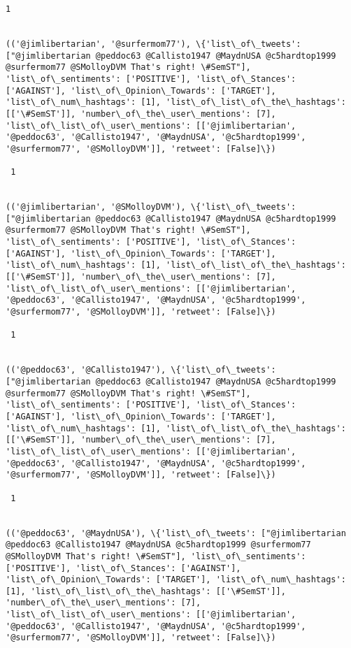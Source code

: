 \documentclass[11pt]{article}
\begin{document}
\begin{Verbatim}[commandchars=\\\{\}]
 1
 

(('@jimlibertarian', '@surfermom77'), \{'list\_of\_tweets': ["@jimlibertarian @peddoc63 @Callisto1947 @MaydnUSA @c5hardtop1999 @surfermom77 @SMolloyDVM That's right! \#SemST"], 'list\_of\_sentiments': ['POSITIVE'], 'list\_of\_Stances': ['AGAINST'], 'list\_of\_Opinion\_Towards': ['TARGET'], 'list\_of\_num\_hashtags': [1], 'list\_of\_list\_of\_the\_hashtags': [['\#SemST']], 'number\_of\_the\_user\_mentions': [7], 'list\_of\_list\_of\_user\_mentions': [['@jimlibertarian', '@peddoc63', '@Callisto1947', '@MaydnUSA', '@c5hardtop1999', '@surfermom77', '@SMolloyDVM']], 'retweet': [False]\})

 1
 

(('@jimlibertarian', '@SMolloyDVM'), \{'list\_of\_tweets': ["@jimlibertarian @peddoc63 @Callisto1947 @MaydnUSA @c5hardtop1999 @surfermom77 @SMolloyDVM That's right! \#SemST"], 'list\_of\_sentiments': ['POSITIVE'], 'list\_of\_Stances': ['AGAINST'], 'list\_of\_Opinion\_Towards': ['TARGET'], 'list\_of\_num\_hashtags': [1], 'list\_of\_list\_of\_the\_hashtags': [['\#SemST']], 'number\_of\_the\_user\_mentions': [7], 'list\_of\_list\_of\_user\_mentions': [['@jimlibertarian', '@peddoc63', '@Callisto1947', '@MaydnUSA', '@c5hardtop1999', '@surfermom77', '@SMolloyDVM']], 'retweet': [False]\})

 1
 

(('@peddoc63', '@Callisto1947'), \{'list\_of\_tweets': ["@jimlibertarian @peddoc63 @Callisto1947 @MaydnUSA @c5hardtop1999 @surfermom77 @SMolloyDVM That's right! \#SemST"], 'list\_of\_sentiments': ['POSITIVE'], 'list\_of\_Stances': ['AGAINST'], 'list\_of\_Opinion\_Towards': ['TARGET'], 'list\_of\_num\_hashtags': [1], 'list\_of\_list\_of\_the\_hashtags': [['\#SemST']], 'number\_of\_the\_user\_mentions': [7], 'list\_of\_list\_of\_user\_mentions': [['@jimlibertarian', '@peddoc63', '@Callisto1947', '@MaydnUSA', '@c5hardtop1999', '@surfermom77', '@SMolloyDVM']], 'retweet': [False]\})

 1
 

(('@peddoc63', '@MaydnUSA'), \{'list\_of\_tweets': ["@jimlibertarian @peddoc63 @Callisto1947 @MaydnUSA @c5hardtop1999 @surfermom77 @SMolloyDVM That's right! \#SemST"], 'list\_of\_sentiments': ['POSITIVE'], 'list\_of\_Stances': ['AGAINST'], 'list\_of\_Opinion\_Towards': ['TARGET'], 'list\_of\_num\_hashtags': [1], 'list\_of\_list\_of\_the\_hashtags': [['\#SemST']], 'number\_of\_the\_user\_mentions': [7], 'list\_of\_list\_of\_user\_mentions': [['@jimlibertarian', '@peddoc63', '@Callisto1947', '@MaydnUSA', '@c5hardtop1999', '@surfermom77', '@SMolloyDVM']], 'retweet': [False]\})


\end{Verbatim}
\end{document}
